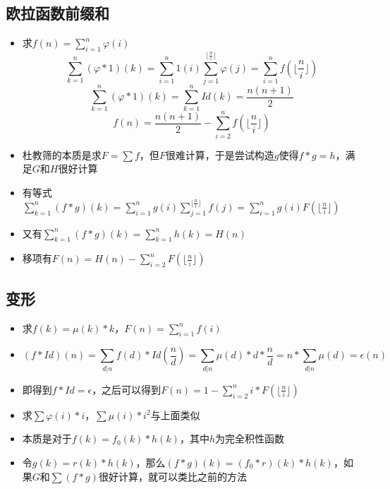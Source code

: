\documentclass{beamer}
\begin{document}
\subsection{欧拉函数前缀和}

\begin{frame}
\begin{itemize}[<+-| alert@+>]
	\item 求$f(n)=\sum_{i=1}^{n}\varphi(i)$
	$$\sum_{k=1}^{n}(\varphi*1)(k)=\sum_{i=1}^{n}1(i)\sum_{j=1}^{\lfloor\frac{n}{i}\rfloor}\varphi(j)=\sum_{i=1}^{n}f(\lfloor\frac{n}{i}\rfloor)$$
	$$\sum_{k=1}^{n}(\varphi*1)(k)=\sum_{k=1}^{n}Id(k)=\frac{n(n+1)}{2}$$
	$$f(n)=\frac{n(n+1)}{2}-\sum_{i=2}^{n}f(\lfloor\frac{n}{i}\rfloor)$$
\end{itemize}
\end{frame}

\begin{frame}
\begin{itemize}[<+-| alert@+>]
	\item 杜教筛的本质是求$F=\sum f$，但$F$很难计算，于是尝试构造$g$使得$f*g=h$，满足$G$和$H$很好计算
	\item 有等式$\sum_{k=1}^{n}(f*g)(k)=\sum_{i=1}^{n}g(i)\sum_{j=1}^{\lfloor\frac{n}{i}\rfloor}f(j)=\sum_{i=1}^{n}g(i)F(\lfloor\frac{n}{i}\rfloor)$
	\item 又有$\sum_{k=1}^{n}(f*g)(k)=\sum_{k=1}^{n}h(k)=H(n)$
	\item 移项有$F(n)=H(n)-\sum_{i=2}^{n}F(\lfloor\frac{n}{i}\rfloor)$
\end{itemize}
\end{frame}

\subsection{变形}

\begin{frame}
\begin{itemize}[<+-| alert@+>]
	\item 求$f(k)=\mu(k)*k$，$F(n)=\sum_{i=1}^{n}f(i)$
	\item $$(f*Id)(n)=\sum_{d|n}f(d)*Id(\frac{n}{d})=\sum_{d|n}\mu(d)*d*\frac{n}{d}=n*\sum_{d|n}\mu(d)=\epsilon(n)$$
	\item 即得到$f*Id=\epsilon$，之后可以得到$F(n)=1-\sum_{i=2}^{n}i*F(\lfloor\frac{n}{i}\rfloor)$
\end{itemize}
\end{frame}

\begin{frame}
\begin{itemize}[<+-| alert@+>]
	\item 求$\sum\varphi(i)*i$，$\sum\mu(i)*i^2$与上面类似
	\item 本质是对于$f(k)=f_0(k)*h(k)$，其中$h$为完全积性函数
	\item 令$g(k)=r(k)*h(k)$，那么$(f*g)(k)=(f_{0}*r)(k)*h(k)$，如果$G$和$\sum(f*g)$很好计算，就可以类比之前的方法
\end{itemize}
\end{frame}

\end{document}
